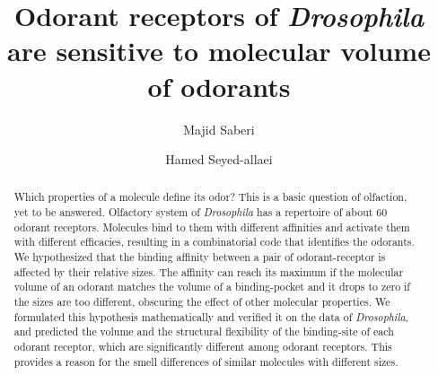 \documentclass[fleqn,11pt]{wlscirep}
\title{Odorant receptors of \textit{Drosophila} are sensitive to molecular volume of odorants}
\author[1]{Majid Saberi}
\author[1,*]{Hamed Seyed-allaei}
\affil[1]{School of Cognitive Sciences, Institute for Research in Fundamental Sciences (IPM), Tehran, Iran}
\affil[*]{hamed@ipm.ir}
\begin{document}
\linenumbers

\begin{abstract} 
Which properties of a molecule define its odor? This is a basic question of olfaction, 
yet to be answered. Olfactory system of \textit{Drosophila} has a repertoire of about 60 odorant receptors. 
Molecules bind to them with different affinities and activate them with different efficacies, 
resulting in a combinatorial code that identifies the odorants. 
We hypothesized that the binding affinity between a pair of odorant-receptor is affected by their relative sizes. 
The affinity can reach its maximum if the molecular volume of an odorant matches the volume of a binding-pocket 
and it drops to zero if the sizes are too different, 
obscuring the effect of other molecular properties. 
We formulated this hypothesis mathematically and verified it on the data of \textit{Drosophila}, 
and predicted the volume and the structural flexibility of the binding-site of each odorant receptor, 
which are significantly different among odorant receptors. 
This provides a reason for the smell differences of similar molecules with different sizes. 
\end{abstract}

\flushbottom
\maketitle

\thispagestyle{empty}

\end{document}
